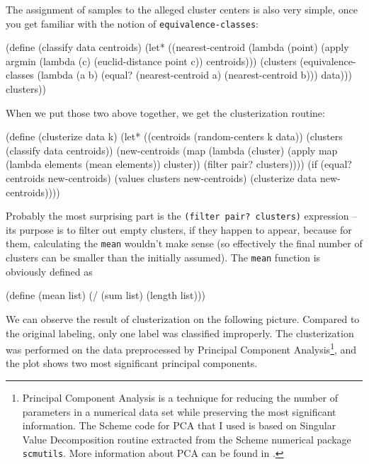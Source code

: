 The assignment of samples to the alleged cluster centers
is also very simple, once you get familiar with the notion
of \texttt{equivalence-classes}:

\begin{Snippet}
(define (classify data centroids)
  (let* ((nearest-centroid (lambda (point)
			     (apply argmin 
                                    (lambda  (c) 
                                      (euclid-distance point c))
				    centroids)))
	 (clusters (equivalence-classes 
                     (lambda (a b)
	               (equal? (nearest-centroid a)
			       (nearest-centroid b)))
		    data)))
    clusters))
\end{Snippet}

When we put those two above together, we get the
clusterization routine:

\begin{Snippet}
(define (clusterize data k)
  (let* ((centroids (random-centers k data))
         (clusters (classify data centroids))
	 (new-centroids (map (lambda (cluster)
			       (apply map (lambda elements 
					    (mean elements)) cluster))
			     (filter pair? clusters))))
    (if (equal? centroids new-centroids)
	(values clusters new-centroids)
	(clusterize data new-centroids))))
\end{Snippet}

Probably the most surprising part is the 
\texttt{(filter pair? clusters)} expression -- its purpose
is to filter out empty clusters, if they happen to appear,
because for them, calculating the \texttt{mean} wouldn't make
sense (so effectively the final number of clusters can be
smaller than the initially assumed). The \texttt{mean} function
is obviously defined as

\begin{Snippet}
(define (mean list)
  (/ (sum list) (length list)))
\end{Snippet}

We can observe the result of clusterization on the following
picture. Compared to the original labeling, only one label
was classified improperly. The clusterization was performed
on the data preprocessed by Principal Component Analysis\footnote{
Principal Component Analysis is a technique for reducing
the number of parameters in a numerical data set while preserving
the most significant information. The Scheme code for PCA
that I used is based on Singular Value Decomposition routine
extracted from the Scheme numerical package \texttt{scmutils}.
More information about PCA can be found in \cite{Shlens2003}.
}, and the plot shows two most significant principal components.


